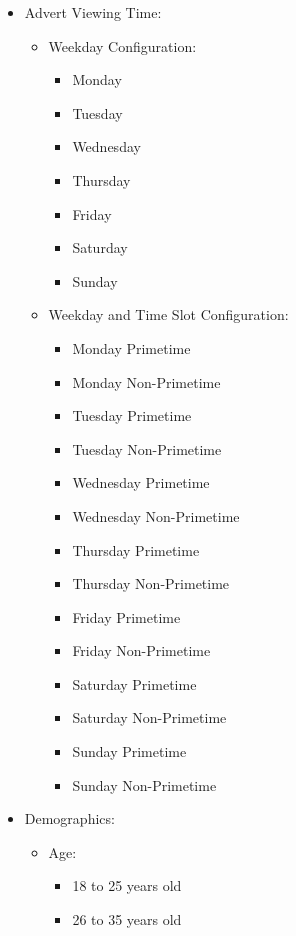 \documentclass[review]{elsarticle}
\begin{document}
\begin{itemize}
    \item{Advert Viewing Time:}
    \begin{itemize}
        \item Weekday Configuration:
        \begin{itemize}
            \item Monday
            \item Tuesday
            \item Wednesday
            \item Thursday
            \item Friday
            \item Saturday
            \item Sunday
        \end{itemize}
        \item Weekday and Time Slot Configuration:
        \begin{itemize}
            \item Monday Primetime
            \item Monday Non-Primetime
            \item Tuesday Primetime
            \item Tuesday Non-Primetime
            \item Wednesday Primetime
            \item Wednesday Non-Primetime
            \item Thursday Primetime
            \item Thursday Non-Primetime
            \item Friday Primetime
            \item Friday Non-Primetime
            \item Saturday Primetime
            \item Saturday Non-Primetime
            \item Sunday Primetime
            \item Sunday Non-Primetime
        \end{itemize}
    \end{itemize}
    \item{Demographics:}
    \begin{itemize}
        \item Age:
        \begin{itemize}
            \item 18 to 25 years old
            \item 26 to 35 years old

\end{itemize}
\end{itemize}
\end{itemize}
\end{document}
